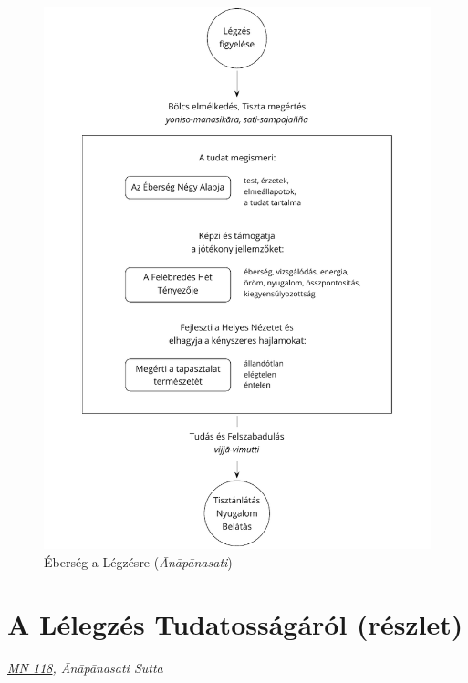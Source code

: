 \clearpage
\figurepagelayout

\begin{figure}[h]
\vspace*{-15pt}
\caption{Éberség a Légzésre (\emph{Ānāpānasati})}\label{fig-mindfulness-of-breathing}
\bigskip
\includegraphics[width=\linewidth]{./manuscript/tex/diagrams/mindfulness-of-breathing-hu.pdf}
\end{figure}

\clearpage
\normalpagelayout

\section{A Lélegzés Tudatosságáról (részlet)}

{\centering
\emph{\href{https://a-buddha-ujja.hu/mn-118/hu/farkas-pal}{MN 118}, Ānāpānasati Sutta}
\par}

